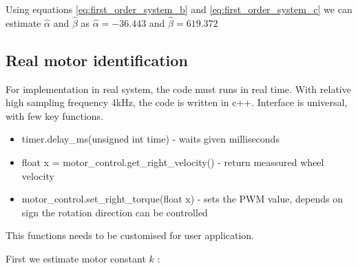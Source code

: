 \documentclass[12pt,twoside,onecolumn,openany,extrafontsizes,dvipsnames]{memoir}
\begin{document}
            Using equations \ref{eq:first_order_system_b} and \ref{eq:first_order_system_c} we can estimate $\hat{\alpha}$ and $\hat{\beta}$ as
            $\hat{\alpha} = -36.443$ and $\hat{\beta} = 619.372$

          

        \subsection{Real motor identification}
            For implementation in real system, the code must runs in real time. With relative high 
            sampling frequency 4kHz, the code is written in c++. Interface is universal, with few key functions.

            \begin{itemize}
                \item timer.delay\_ms(unsigned int time) - waits given milliseconds
                \item float x = motor\_control.get\_right\_velocity() - return meassured wheel velocity
                \item motor\_control.set\_right\_torque(float x) - sets the PWM value, depends on sign the rotation direction can be controlled
            \end{itemize}

            This functions needs to be customised for user application.

            \newpage
            First we estimate motor constant $k$ :
            
\end{document}
